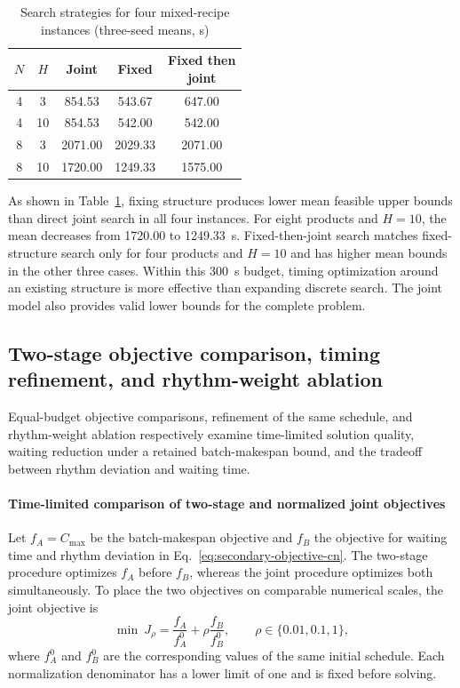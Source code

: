 \documentclass[final,5p,times,twocolumn]{elsarticle}
\begin{document}
\begin{table}[!htbp]
\centering\small
\caption{Search strategies for four mixed-recipe instances (three-seed means, s)}
\label{tab:structure-ablation-cn}
\begin{tabular}{ccccc}\toprule
$N$ & $H$ & Joint & Fixed & \makecell[c]{Fixed then\\joint}\\\midrule
4 & 3 & 854.53 & 543.67 & 647.00\\
4 & 10 & 854.53 & 542.00 & 542.00\\
8 & 3 & 2071.00 & 2029.33 & 2071.00\\
8 & 10 & 1720.00 & 1249.33 & 1575.00\\
\bottomrule\end{tabular}
\end{table}


As shown in Table~\ref{tab:structure-ablation-cn}, fixing structure produces lower mean feasible upper bounds than direct joint search in all four instances. For eight products and $H=10$, the mean decreases from 1720.00 to 1249.33~s. Fixed-then-joint search matches fixed-structure search only for four products and $H=10$ and has higher mean bounds in the other three cases. Within this 300~s budget, timing optimization around an existing structure is more effective than expanding discrete search. The joint model also provides valid lower bounds for the complete problem.

\subsection{Two-stage objective comparison, timing refinement, and rhythm-weight ablation}
\label{sec:stage2-validation-cn}
Equal-budget objective comparisons, refinement of the same schedule, and rhythm-weight ablation respectively examine time-limited solution quality, waiting reduction under a retained batch-makespan bound, and the tradeoff between rhythm deviation and waiting time.

\paragraph{Time-limited comparison of two-stage and normalized joint objectives}
Let $f_A=C_{\max}$ be the batch-makespan objective and $f_B$ the objective for waiting time and rhythm deviation in Eq.~\eqref{eq:secondary-objective-cn}. The two-stage procedure optimizes $f_A$ before $f_B$, whereas the joint procedure optimizes both simultaneously. To place the two objectives on comparable numerical scales, the joint objective is
\[
\min\ J_\rho=\frac{f_A}{f_A^0}+\rho\frac{f_B}{f_B^0},
\qquad \rho\in\{0.01,0.1,1\},
\]
where $f_A^0$ and $f_B^0$ are the corresponding values of the same initial schedule. Each normalization denominator has a lower limit of one and is fixed before solving.
\end{document}
